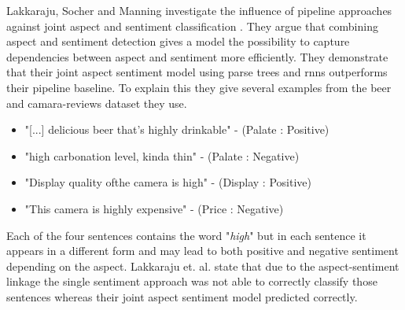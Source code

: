 Lakkaraju, Socher and Manning investigate the influence of pipeline approaches against joint aspect and sentiment classification \cite{Lakkaraju2014}. They argue that combining aspect and sentiment detection gives a model the possibility to capture dependencies between aspect and sentiment more efficiently. They demonstrate that their joint aspect sentiment model using parse trees and \glspl{rnn} outperforms their pipeline baseline. To explain this they give several examples from the beer \cite{McAuley2012, McAuley2013b} and camara-reviews dataset they use. 

\begin{itemize}
	\item "{[...]} delicious beer that’s highly drinkable" - {(Palate : Positive)}
	\item "high carbonation level, kinda thin" - {(Palate : Negative)}
	\item "Display quality ofthe camera is high" - {(Display : Positive)}
	\item "This camera is highly expensive" - {(Price : Negative)}
\end{itemize}

Each of the four sentences contains the word "\textit{high}" but in each sentence it appears in a different form and may lead to both positive and negative sentiment depending on the aspect. Lakkaraju et. al. state that due to the aspect-sentiment linkage the single sentiment approach was not able to correctly classify those sentences whereas their joint aspect sentiment model predicted correctly.
\medskip

